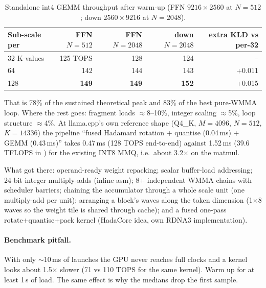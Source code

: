 \documentclass[10pt,a4paper]{article}
\newcommand{\tx}[1]{\texttt{\detokenize{#1}}}
\begin{document}
\begin{table}[H]
\centering\small
\caption{Standalone int4 GEMM throughput after warm-up (FFN $9216\times2560$ at $N=512$; down $2560\times9216$ at $N=2048$).}
\begin{tabular}{@{}lrrrr@{}}
\toprule
Sub-scale per & FFN $N{=}512$ & FFN $N{=}2048$ & down $N{=}2048$ & extra KLD vs per-32\\
\midrule
32 K-values & 125 TOPS & 128 & 124 & --\\
64 & 142 & 144 & 143 & +0.011\\
128 & \textbf{149} & \textbf{149} & \textbf{152} & +0.015\\
\bottomrule
\end{tabular}
\end{table}
That is 78\% of the sustained theoretical peak and 83\% of the best pure-WMMA loop. Where the rest goes: fragment loads
$\approx$8--10\%, integer scaling $\approx$5\%, loop structure $\approx$4\%. At llama.cpp's own reference shape
(Q4\_K, $M{=}4096$, $N{=}512$, $K{=}14336$) the pipeline ``fused Hadamard rotation + quantise (0.04\,ms) + GEMM (0.43\,ms)''
takes 0.47\,ms (128 TOPS end-to-end) against 1.52\,ms (39.6 TFLOPS in \tx{test-backend-ops}) for the existing INT8 MMQ,
i.e.\ about 3.2$\times$ on the matmul.

What got there: operand-ready weight repacking; scalar buffer-load addressing; 24-bit integer multiply-adds (inline asm);
8+ independent WMMA chains with scheduler barriers; chaining the accumulator through a whole scale unit (one multiply-add per
unit); arranging a block's waves along the token dimension (1$\times$8 waves so the weight tile is shared through cache);
and a fused one-pass rotate+quantise+pack kernel (HadaCore idea, own RDNA3 implementation).

\paragraph{Benchmark pitfall.} With only $\sim$10\,ms of launches the GPU never reaches full clocks and a kernel looks about
1.5$\times$ slower (71 vs 110 TOPS for the same kernel). Warm up for at least 1\,s of load. The same effect is why the
\tx{llama-bench} medians drop the first sample.
\end{document}
